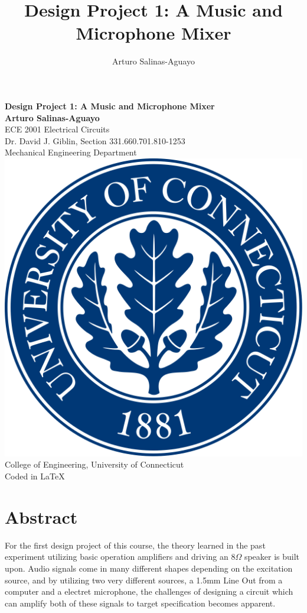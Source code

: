 \documentclass[12pt]{article}
\author{Arturo Salinas-Aguayo}
\title{Design Project 1: A Music and Microphone Mixer}
\begin{document}
\newcommand{\closure}[2][3]{%
	{}\mkern#1mu\overline{\mkern-#1mu#2}}
\newcommand\ncoverline[1]{\mkern1mu\overline{\mkern-1mu#1\mkern-1mu}\mkern1mu}
\begin{titlepage}
	\centering
	\vspace*{3cm}
	\huge\textbf{Design Project 1: A Music and Microphone Mixer}\\
	\vspace{5cm}
	\Large\textbf{Arturo Salinas-Aguayo}\\
	\normalsize
	ECE 2001 Electrical Circuits\\
	Dr. David J. Giblin, Section 331.660.701.810-1253\\
	Mechanical Engineering Department
	\vfill
	\includegraphics[scale=0.1]{uconnlogo}\\
	College of Engineering, University of Connecticut\\
	\scriptsize{Coded in \LaTeX}
	\vspace*{1cm}
\end{titlepage}
\tableofcontents
\newpage
\section{Abstract}
For the first design project of this course, the theory learned in the past
experiment utilizing basic operation amplifiers and driving an $8\Omega$ speaker
is built upon. Audio signals come in many different shapes depending on the
excitation source, and by utilizing two very different sources, a 1.5mm Line Out
from a computer and a electret microphone, the challenges of designing a circuit
which can amplify both of these signals to target specification becomes
apparent.
\end{document}
